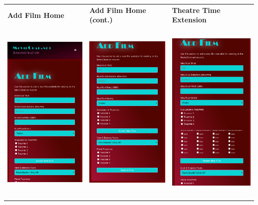 \documentclass[11pt, english]{article}
\begin{document}
	\begin{center}
        	\scriptsize
        \begin{longtable}{p{5cm}p{5cm}p{5cm}}
		\textbf{Add Film Home} & \textbf{Add Film Home (cont.)} & \textbf{Theatre Time Extension}\\
		\includegraphics[width=5cm,height=9cm]{CS993_IMG/admin1.png} & \includegraphics[width=5cm,height=9cm]{CS993_IMG/admin2.png} & \includegraphics[width=5cm,height=9cm]{CS993_IMG/admin3.png}\\

\end{longtable}
\end{center}
\end{document}
